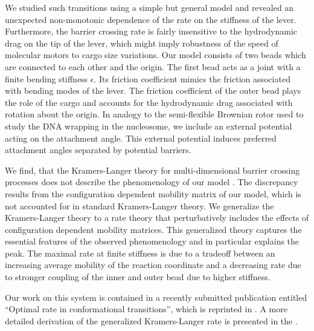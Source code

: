 We studied such transitions using a simple but general model and revealed an unexpected 
non-monotonic dependence of the rate on the stiffness of the lever. Furthermore, the barrier
crossing rate is fairly insensitive to the hydrodynamic drag on the tip of the lever, which might
imply robustness of the speed of molecular motors to cargo size variations. Our model consists of two 
beads which are connected to each other and the origin. The first bead acts as a joint with a finite 
bending stiffness $\epsilon$. Its friction coefficient mimics the friction associated with bending modes of 
the lever. The friction coefficient of the outer bead plays the role of the cargo and accounts 
for the hydrodynamic drag associated with rotation about the origin. 
In analogy to the semi-flexible Brownian rotor used to study the DNA wrapping in the nucleosome, we 
include an external potential acting on the attachment angle. This external potential induces preferred attachment
angles separated by potential barriers.

We find, that the Kramers-Langer theory for multi-dimensional barrier crossing processes does not
describe the phenomenology of our model \cite{Langer_APNY_69}. The discrepancy results from the
configuration dependent mobility matrix of our model, which is not accounted for in standard Kramers-Langer
theory. We generalize
the Kramers-Langer theory to a rate theory that perturbatively includes the effects of 
configuration dependent mobility matrices. This generalized theory captures the essential features
of the observed phenomenology and in particular explains the peak. The maximal rate at finite stiffness 
is due to a tradeoff between an increasing average mobility of the reaction coordinate and a decreasing
rate due to stronger coupling of the inner and outer bead due to higher stiffness. 

Our work on this system is contained in a recently submitted publication entitled ``Optimal rate
in conformational transitions'', which is reprinted in . A more detailed derivation of
the generalized Kramers-Langer rate is presented in the .

